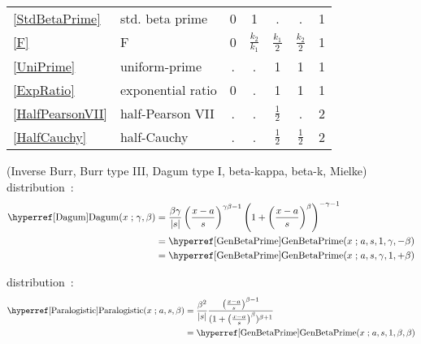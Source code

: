 \begin{table*}[tp]
\begin{center}
{\begin{tabular}{llccccc}
\eqref{StdBetaPrime} & std. beta prime		& 0 & 1 & . & . & 1  \\
\eqref{F} & F	&  0 &  $\tfrac{k_2}{k_1}$ & $\tfrac{k_1}{2}$ & $\tfrac{k_2}{2}$   &    1     \\
\eqref{UniPrime} & uniform-prime	& . & . & 1 & 1 & 1  \\
\eqref{ExpRatio} & exponential ratio		& 0 & . & 1 & 1 & 1  \\
\eqref{HalfPearsonVII} & half-Pearson  VII	&  . &  .  &   $\tfrac{1}{2}$ & .   &    2     \\
\eqref{HalfCauchy} & half-Cauchy	&  . &  . & $\tfrac{1}{2}$ & $\tfrac{1}{2}$   &    2     \\
\end{tabular} 
}
\end{center}
\end{table*}





 (Inverse Burr, Burr type III, Dagum type I,  beta-kappa, beta-k, Mielke) distribution~\cite{Burr1942, Dagum1977, Tadikamalla1980}:
\begin{align}
\label{Dagum}
\opr{Dagum}(x\given  \gamma,\beta) 
&=  \frac{\beta \gamma}{|s|} \left(\frac{x-a}{s}\right)^{\gamma \beta-1}  \left(1+\left(\frac{x-a}{s}\right)^\beta\right)^{-\gamma-1} 
\checked
\\ \notag &= \opr{GenBetaPrime}(x\given a, s, 1, \gamma,-\beta) \checked
\\ \notag &= \opr{GenBetaPrime}(x\given a, s, \gamma,1,+\beta) \checked
\end{align}

 distribution~\cite{Kleiber2003}:
\begin{align}
\label{Paralogistic}
\opr{Paralogistic}(x\given a, s, \beta) &= \frac{\beta^2}{|s|} \frac{ \left(\frac{x-a}{s}\right)^{\beta-1}}{ (1+ \left(\frac{x-a}{s}\right)^\beta)^{\beta+1} } \checked
\\ \notag &= \opr{GenBetaPrime}(x\given a, s, 1,\beta,\beta) 
\end{align}


